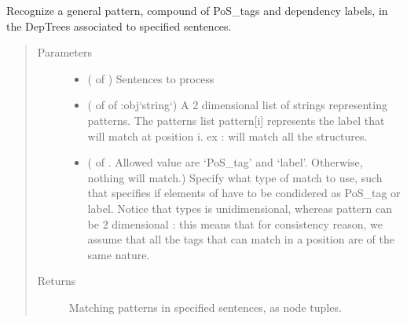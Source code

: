 \documentclass[letterpaper,10pt,english]{sphinxmanual}
\begin{document}

\begin{fulllineitems}
\label{\detokenize{analysis:loacore.analysis.pattern_recognition.general_pattern_recognition}}
Recognize a general pattern, compound of PoS\_tags and dependency labels, in the DepTrees associated to specified
sentences.
\begin{quote}\begin{description}
\item[{Parameters}] \leavevmode\begin{itemize}
\item {} 
 ( of ) \textendash{} Sentences to process

\item {} 
 ( of  of :obj{}`string{}`) \textendash{} A 2 dimensional list of strings representing patterns. The patterns list pattern{[}i{]} represents the label
that will match at position i. ex :  will match all the
 structures.

\item {} 
 ( of . Allowed value are ‘PoS\_tag’ and ‘label’. Otherwise, nothing will
match.) \textendash{} Specify what type of match to use, such that  specifies if elements of  have to be
condidered as PoS\_tag or label. Notice that types is unidimensional, whereas pattern can be 2 dimensional :
this means that for consistency reason, we assume that all the tags that can match in a position  are of
the same nature.

\end{itemize}

\item[{Returns}] \leavevmode
Matching patterns in specified sentences, as node tuples.


\end{description}
\end{quote}
\end{fulllineitems}
\end{document}
